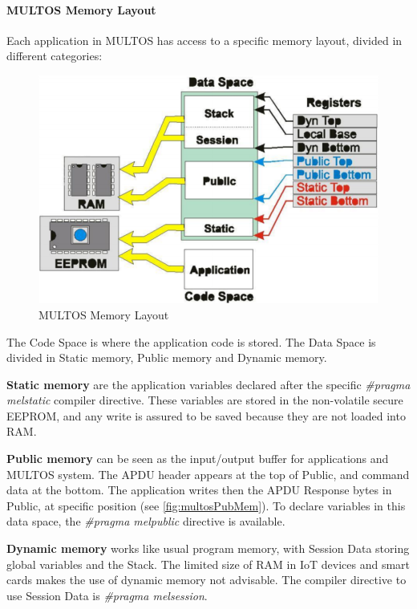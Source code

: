 \paragraph{MULTOS Memory Layout}

Each application in MULTOS has access to a specific memory layout, divided in different categories:

\begin{figure}[bth]
	\begin{center}
		\includegraphics[width=0.8\linewidth]{gfx/multosMemLay}
	\end{center}
	\caption{MULTOS Memory Layout}
	\label{fig:multosMemLay}
\end{figure}


The Code Space is where the application code is stored.
The Data Space is divided in Static memory, Public memory and Dynamic memory.

\textbf{Static memory} are the application variables declared after the specific \textit{\#pragma melstatic} compiler directive. These variables are stored in the non-volatile secure EEPROM, and any write is assured to be saved because they are not loaded into RAM.

\textbf{Public memory} can be seen as the input/output buffer for applications and MULTOS system. The APDU header appears at the top of Public, and command data at the bottom. The application writes then the APDU Response bytes in Public, at specific position (see \autoref{fig:multosPubMem}). To declare variables in this data space, the \textit{\#pragma melpublic} directive is available.

\textbf{Dynamic memory} works like usual program memory, with Session Data storing global variables and the Stack. The limited size of RAM in IoT devices and smart cards makes the use of dynamic memory not advisable. The compiler directive to use Session Data is \textit{\#pragma melsession}.


